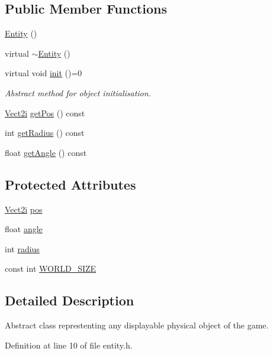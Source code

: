 \subsection*{Public Member Functions}
\begin{DoxyCompactItemize}
\item 
\hyperlink{class_entity_a980f368aa07ce358583982821533a54a}{Entity} ()
\item 
virtual \hyperlink{class_entity_a588098978eea6a3486b7361605ff3f0f}{$\sim$\-Entity} ()
\item 
virtual void \hyperlink{class_entity_a31e6183ea44922d54a43be48b8fd4bc0}{init} ()=0
\begin{DoxyCompactList}\small\item\em Abstract method for object initialisation. \end{DoxyCompactList}\item 
\hyperlink{struct_vect2i}{Vect2i} \hyperlink{class_entity_ac010fabbecbd86e008c69560bd216b86}{get\-Pos} () const 
\item 
int \hyperlink{class_entity_ac2f290a20927f548e8742976b222a556}{get\-Radius} () const 
\item 
float \hyperlink{class_entity_a9cecc58b1b2f0c124701ff7add1b8224}{get\-Angle} () const 
\end{DoxyCompactItemize}
\subsection*{Protected Attributes}
\begin{DoxyCompactItemize}
\item 
\hyperlink{struct_vect2i}{Vect2i} \hyperlink{class_entity_a885ee23e7a2132f0d890bb2e312e6d77}{pos}
\item 
float \hyperlink{class_entity_abb6791bd923767cdf42a7e3101a6f76d}{angle}
\item 
int \hyperlink{class_entity_acd7af12063926ab8cd654539328e5532}{radius}
\item 
const int \hyperlink{class_entity_a2b870ef127d06e3f98109695817a1798}{W\-O\-R\-L\-D\-\_\-\-S\-I\-Z\-E}
\end{DoxyCompactItemize}


\subsection{Detailed Description}
Abstract class represtenting any displayable physical object of the game. 

Definition at line 10 of file entity.\-h.



